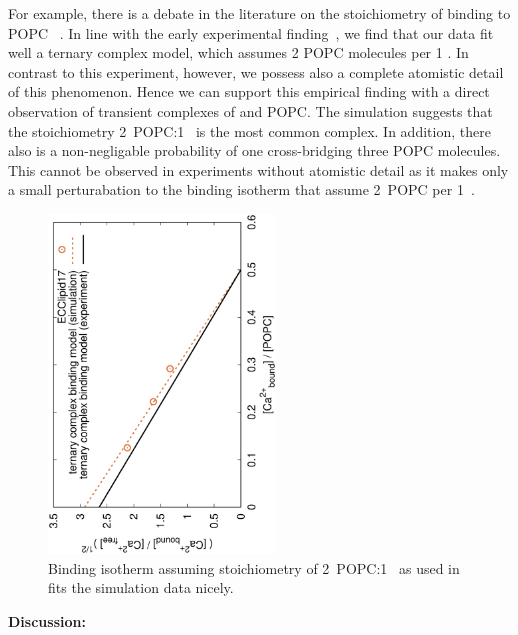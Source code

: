 \documentclass[aip,jcp,twocolumn]{revtex4}
\begin{document}
{For example, there is a debate in the literature on the stoichiometry of  binding to POPC~\cite{Altenbach84} . 
In line with the early experimental finding~\cite{Altenbach84}, we find that our data fit well a ternary complex model, which assumes 2 POPC molecules per 1 . 
In contrast to this experiment, however, we possess also a complete atomistic detail of this phenomenon.
Hence we can support this empirical finding with a direct observation of transient complexes of  and POPC.
The simulation suggests that the stoichiometry 2~POPC:1~ is the most common complex. 
In addition, there also is a non-negligable probability of one   cross-bridging three POPC molecules. 
This cannot be observed in experiments without atomistic detail as it makes only a small perturabation to the binding isotherm that assume 2~POPC per 1~. 

\begin{figure}[]
  \centering
  \includegraphics[height=9.0cm,angle=-90]{../Fig/bound-CAs_conc-eccl17.eps}
  \caption{\label{fig:cacl-bind}
    Binding isotherm assuming stoichiometry of 2~POPC:1~ as used in \cite{Altenbach84} fits the simulation data nicely.}
\end{figure}



\textbf{Discussion:}


}
\end{document}

